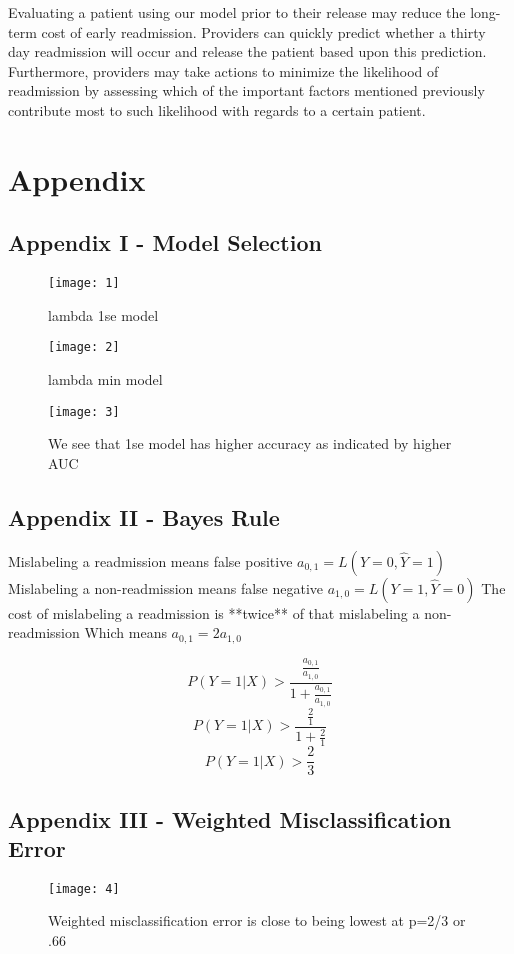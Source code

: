 \documentclass{article}
\begin{document}
Evaluating a patient using our model prior to their release may reduce the long-term cost of early readmission. Providers can quickly predict whether a thirty day readmission will occur and release the patient based upon this prediction. Furthermore, providers may take actions to minimize the likelihood of readmission by assessing which of the important factors mentioned previously contribute most to such likelihood with regards to a certain patient. 

\section{Appendix}
\subsection{Appendix I - Model Selection}


\begin{figure}[h]
\centering
\texttt{[image: 1]}
\caption{lambda 1se model}
\end{figure}

\begin{figure}[h]
\centering
\texttt{[image: 2]}
\caption{lambda min model}
\end{figure}

\begin{figure}[h]
\centering
\texttt{[image: 3]}
\caption{We see that 1se model has higher accuracy as indicated by higher AUC}
\end{figure}

\newpage

\subsection{Appendix II - Bayes Rule}

Mislabeling a readmission means false positive $a_{0,1}=L(Y=0, \hat Y=1)$
Mislabeling a non-readmission means false negative $a_{1,0}=L(Y=1, \hat Y=0)$
The cost of mislabeling a readmission is **twice** of that mislabeling a non-readmission
Which means $a_{0,1}=2a_{1,0}$

$$P(Y=1 \vert X) > \frac{\frac{a_{0,1}}{a_{1,0}}}{1 + \frac{a_{0,1}}{a_{1,0}}}$$
$$P(Y=1 \vert X) > \frac{\frac{2}{1}}{1 + \frac{2}{1}}$$
$$P(Y=1 \vert X) > \frac{2}{3}$$

\subsection{Appendix III - Weighted Misclassification Error}

\begin{figure}[h]
\centering
\texttt{[image: 4]}
\caption{Weighted misclassification error is close to being lowest at p=2/3 or .66}
\end{figure}
\end{document}
